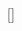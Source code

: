 \begin{adjustbox}{frame=0.5pt 1em,max width=\textwidth,center,tabular=@{}c@{}}
\begin{adjustbox}{max width=\linewidth,tabular=@{}c@{}}
\end{adjustbox}\\
\\
\begin{adjustbox}{max width=\linewidth,tabular=@{}c@{}}
[]
\end{adjustbox}
\end{adjustbox}